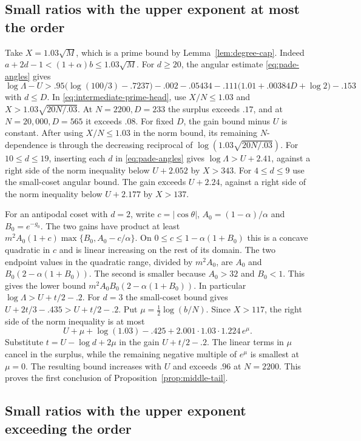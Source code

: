 \subsection{Small ratios with the upper exponent at most the order}

Take \(X=1.03\sqrt M\), which is a prime bound by
Lemma~\ref{lem:degree-cap}. Indeed
\(a+2d-1<(1+\alpha)b\le1.03\sqrt M\).
For \(d\ge20\), the angular estimate
\eqref{eq:pade-angles} gives
\[
 \log\Lambda-U>
 .95\bigl(\log(100/3)-.7237\bigr)-.002-.05434
 - .111\bigl(1.01+.00384D+\log2\bigr)-.153
\]
with \(d\le D\). In \eqref{eq:intermediate-prime-head},
use \(X/N\le1.03\) and \(X>1.03\sqrt{20N/.03}\).
At \(N=2200,D=233\) the surplus exceeds \(.17\), and at
\(N=20{,}000,D=565\) it exceeds \(.08\).
For fixed \(D\), the gain bound minus \(U\) is constant.
After using \(X/N\le1.03\) in the norm bound, its remaining
\(N\)-dependence is through the decreasing reciprocal of
\(\log(1.03\sqrt{20N/.03})\).
For \(10\le d\le19\), inserting each \(d\) in
\eqref{eq:pade-angles} gives \(\log\Lambda>U+2.41\),
against a right side of the norm inequality below \(U+2.052\) by \(X>343\).
For \(4\le d\le9\) use the small-coset angular bound. The gain
exceeds \(U+2.24\), against a right side of the norm inequality below \(U+2.177\)
by \(X>137\).

For an antipodal coset with \(d=2\), write \(c=|\cos\theta|\),
\(A_0=(1-\alpha)/\alpha\) and \(B_0=e^{-g_0}\).
The two gains have product at least
\(m^2A_0(1+c)\max\{B_0,A_0-c/\alpha\}\).
On \(0\le c\le1-\alpha(1+B_0)\) this is a concave quadratic
in \(c\) and is linear increasing on the rest of its domain.
The two endpoint values in the quadratic range, divided by
\(m^2A_0\), are \(A_0\) and \(B_0(2-\alpha(1+B_0))\).
The second is smaller because \(A_0>32\) and \(B_0<1\).
This gives the lower bound \(m^2A_0B_0(2-\alpha(1+B_0))\).
In particular \(\log\Lambda>U+t/2-.2\).
For \(d=3\) the small-coset bound gives
\(U+2t/3-.435>U+t/2-.2\).
Put \(\mu=\tfrac12\log(b/N)\).
Since \(X>117\), the right side of the norm inequality is at most
\[
 U+\mu+\log(1.03)-.425+
       2.001\cdot1.03\cdot1.224\,e^\mu.
\]
Substitute \(t=U-\log d+2\mu\) in the gain \(U+t/2-.2\).
The linear terms in \(\mu\) cancel in the surplus, while the
remaining negative multiple of \(e^\mu\) is smallest at
\(\mu=0\). The resulting bound increases with \(U\)
and exceeds \(.96\) at \(N=2200\).
This proves the first conclusion of Proposition~\ref{prop:middle-tail}.

\subsection{Small ratios with the upper exponent exceeding the order}

